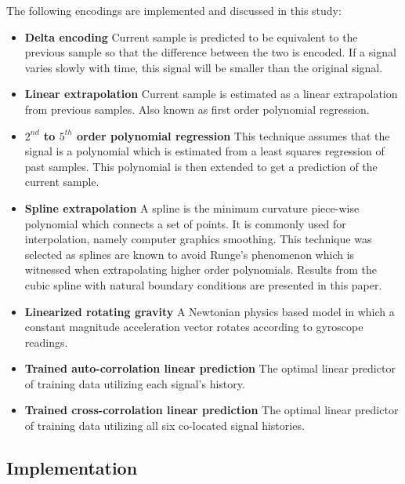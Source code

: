 \documentclass[journal]{IEEEtran}
\begin{document}
The following encodings are implemented and discussed in this study:

\begin{itemize}
  \item \textbf{Delta encoding} Current sample is predicted to be equivalent to the previous sample so that the difference between the two is encoded. If a signal varies slowly with time, this signal will be smaller than the original signal.
  \item \textbf{Linear extrapolation} Current sample is estimated as a linear extrapolation from previous samples. Also known as first order polynomial regression.
  \item \textbf{\boldmath$2^{nd}$ to \boldmath$5^{th}$ order polynomial regression} This technique assumes that the signal is a polynomial which is estimated from a least squares regression of past samples. This polynomial is then extended to get a prediction of the current sample.
  \item \textbf{Spline extrapolation} A spline is the minimum curvature piece-wise polynomial which connects a set of points. It is commonly used for interpolation, namely computer graphics smoothing. This technique was selected as splines are known to avoid Runge's phenomenon which is witnessed when extrapolating higher order polynomials. Results from the cubic spline with natural boundary conditions are presented in this paper.
  \item \textbf{Linearized rotating gravity} A Newtonian physics based model in which a constant magnitude acceleration vector rotates according to gyroscope readings.
  \item \textbf{Trained auto-corrolation linear prediction} The optimal linear predictor of training data utilizing each signal's history.
   \item \textbf{Trained cross-corrolation linear prediction} The optimal linear predictor of training data utilizing all six co-located signal histories.
\end{itemize}

\subsection{Implementation}
\end{document}
